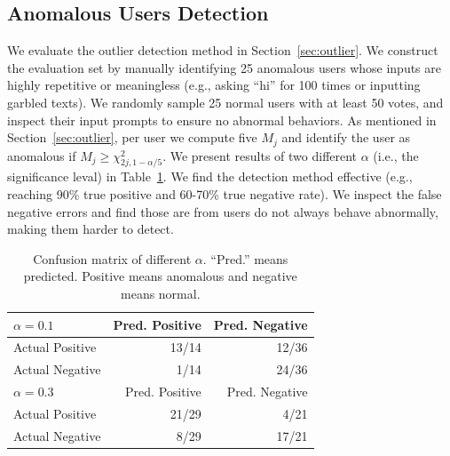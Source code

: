 \documentclass{article}
\newcommand{\showcomments}{yes}
\newcommand\todo[1]{\ifthenelse{\equal{\showcomments}{yes}}{{\color{red} TODO: #1}}{\ignorespaces}}
\newcommand\dl[1]{\ifthenelse{\equal{\showcomments}{yes}}{{\color{orange} DL: #1}}{\ignorespaces}}
\begin{document}




\subsection{Anomalous Users Detection}

We evaluate the outlier detection method in Section~\ref{sec:outlier}.
We construct the evaluation set by manually identifying 25 anomalous users whose inputs are highly repetitive or meaningless (e.g., asking ``hi'' for 100 times or inputting garbled texts).
We randomly sample 25 normal users with at least 50 votes, and inspect their input prompts to ensure no abnormal behaviors.
As mentioned in Section~\ref{sec:outlier}, per user we compute five $M_j$ and identify the user as anomalous if $M_j \geq \chi^2_{2j, 1-\alpha/5}$.
We present results of two different $\alpha$ (i.e., the significance leval) in Table~\ref{tab:confusion}. We find the detection method effective (e.g., reaching 90\% true positive and 60-70\% true negative rate). We inspect the false negative errors and find those are from users do not always behave abnormally, making them harder to detect.

\begin{table}[]
\centering
\caption{Confusion matrix of different $\alpha$. ``Pred.'' means predicted. Positive means anomalous and negative means normal.} %
\label{tab:confusion}
\begin{tabular}{lrr}
\toprule
$\alpha=0.1$  & Pred. Positive & Pred. Negative \\
\midrule
Actual Positive  &  13/14  &   12/36      \\ 
Actual Negative  &  1/14  &   24/36    \\ 
\bottomrule
$\alpha=0.3$  & Pred. Positive & Pred. Negative \\
\midrule
Actual Positive  &  21/29  &   4/21      \\ 
Actual Negative  &  8/29  &    17/21     \\ 
\bottomrule
\end{tabular}
\vspace{-10px}
\end{table}
\end{document}
